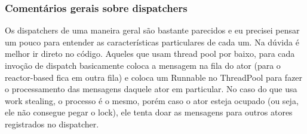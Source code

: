 \documentclass[]{article}
\begin{document}
		\subsubsection{Comentários gerais sobre dispatchers}
		Os dispatchers de uma maneira geral são bastante parecidos e eu precisei pensar um pouco para entender as características
		particulares de cada um. Na dúvida é melhor ir direto no código. Aqueles que usam thread pool por baixo, para cada invoção
		de dispatch basicamente coloca a mensagem na fila do ator (para o reactor-based fica em outra fila) e coloca um Runnable no
		ThreadPool para fazer o processamento das mensagens daquele ator em particular. No caso do que usa work stealing, o processo
		é o mesmo, porém caso o ator esteja ocupado (ou seja, ele não consegue pegar o lock), ele tenta doar as mensagens para 
		outros atores registrados no dispatcher.
			 
\newpage


\end{document}
